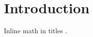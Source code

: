 \documentclass[acmsmall,nonacm]{acmart}
\begin{document}
\thispagestyle{empty}%

\section{Introduction}
Inline math in titles \cite{lam,greek,custom,adv,multi}.



\end{document}
